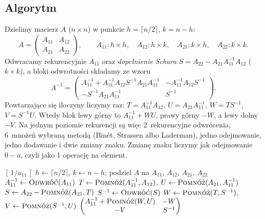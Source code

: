 \subsection{Algorytm}
Dzielimy macierz $A$ ($n\times n$) w punkcie $h=\lceil n/2\rceil$, $k=n-h$:
\[
A=\begin{pmatrix}A_{11}&A_{12}\\A_{21}&A_{22}\end{pmatrix},\qquad
A_{11}\colon h\times h,\quad A_{12}\colon h\times k,\quad A_{21}\colon k\times h,\quad A_{22}\colon k\times k.
\]
Odwracamy rekurencyjnie $A_{11}$ oraz \emph{dopełnienie Schura} $S=A_{22}-A_{21}A_{11}^{-1}A_{12}$ ($k\times k$),
a bloki odwrotności składamy ze wzoru
\begin{equation}\label{eq:inv}
A^{-1}=\begin{pmatrix}
A_{11}^{-1}+A_{11}^{-1}A_{12}S^{-1}A_{21}A_{11}^{-1} & -A_{11}^{-1}A_{12}S^{-1}\\[2pt]
-S^{-1}A_{21}A_{11}^{-1} & S^{-1}
\end{pmatrix}.
\end{equation}
Powtarzające się iloczyny liczymy raz: $T=A_{11}^{-1}A_{12}$, $U=A_{21}A_{11}^{-1}$, $W=TS^{-1}$, $V=S^{-1}U$.
Wtedy blok lewy górny to $A_{11}^{-1}+WU$, prawy górny $-W$, a lewy dolny $-V$. Na jednym poziomie rekurencji są więc
2~rekurencyjne odwrócenia, 6~mnożeń wybraną metodą (Binét, Strassen albo Laderman), jedno odejmowanie, jedno
dodawanie i dwie zmiany znaku. Zmianę znaku liczymy jak odejmowanie $0-a$, czyli jako 1 operację na element.

\begin{algorithm}[H]
\caption{Rekurencyjne odwracanie macierzy}
\begin{algorithmic}[1]
 
    \State \Return $[\,1/a_{11}\,]$
  \EndIf
  \State $h\gets\lceil n/2\rceil$, $k\gets n-h$; podziel $A$ na $A_{11}$, $A_{12}$, $A_{21}$, $A_{22}$
  \State $A_{11}^{-1}\gets\Odwroc(A_{11})$
  \State $T\gets\Pomnoz(A_{11}^{-1},A_{12})$, \; $U\gets\Pomnoz(A_{21},A_{11}^{-1})$
  \State $S\gets A_{22}-\Pomnoz(A_{21},T)$
  \State $S^{-1}\gets\Odwroc(S)$
  \State $W\gets\Pomnoz(T,S^{-1})$, \; $V\gets\Pomnoz(S^{-1},U)$
  \State \Return $\begin{pmatrix}A_{11}^{-1}+\Pomnoz(W,U) & -W\\ -V & S^{-1}\end{pmatrix}$
\EndProcedure
\end{algorithmic}
\end{algorithm}

